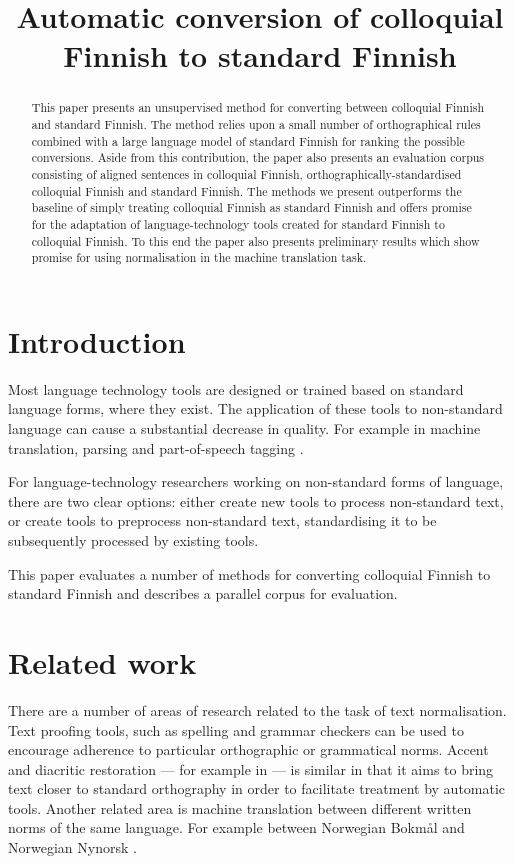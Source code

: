 \documentclass[11pt]{article}
\title{Automatic conversion of colloquial Finnish to standard Finnish}
\author{}
\date{}
\begin{document}
\maketitle
\begin{abstract}
  This paper presents an unsupervised method for converting between colloquial Finnish
  and standard Finnish. The method relies upon a small number of orthographical rules
  combined with a large language model of standard Finnish for ranking the possible 
  conversions. Aside from this contribution, the paper also presents an evaluation
  corpus consisting of aligned sentences in colloquial Finnish, orthographically-standardised
  colloquial Finnish and standard Finnish. The methods we present outperforms the baseline
  of simply treating colloquial Finnish as standard Finnish and offers promise for the adaptation
  of language-technology tools created for standard Finnish to colloquial Finnish. To this end
  the paper also presents preliminary results which show promise for using normalisation in 
  the machine translation task.
\end{abstract}

\section{Introduction}

Most language technology tools are designed or trained based on standard language 
forms, where they exist. The application of these tools to non-standard
language can cause a substantial decrease in quality. For example in machine translation,
parsing and part-of-speech tagging \cite{eisenstein2013}.

For language-technology researchers working on non-standard forms of language, there are 
two clear options: either create new tools to process non-standard text,
  or create tools to preprocess non-standard text, standardising it to be subsequently processed
 by existing tools.

This paper evaluates a number of methods for converting colloquial Finnish to standard Finnish and describes a parallel corpus for evaluation.

\section{Related work}

There are a number of areas of research related to the task of text normalisation. Text
proofing tools, such as spelling and grammar checkers \cite{kukich1992} can be used to encourage adherence
to particular orthographic or grammatical norms. Accent and diacritic restoration --- for example in  --- is similar
in that it aims to bring text closer to standard orthography in order to facilitate treatment by 
automatic tools. Another related area is machine translation between different written norms of 
the same language. For example between Norwegian Bokm\aa{}l and Norwegian Nynorsk \cite{unhammer2009}.
\end{document}
